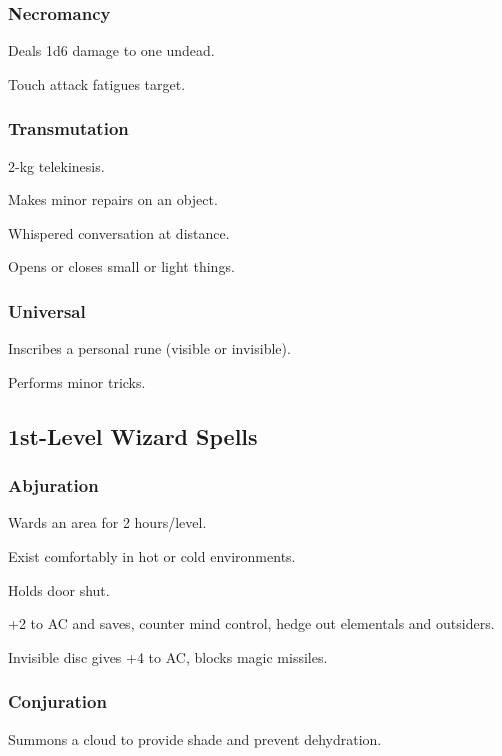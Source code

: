 \subsubsection{Necromancy}
	 Deals 1d6 damage to one undead.

	 Touch attack fatigues target.

\subsubsection{Transmutation}
	 2-kg telekinesis.

	 Makes minor repairs on an object.

	 Whispered conversation at distance.

	 Opens or closes small or light things.

\subsubsection{Universal}
	 Inscribes a personal rune (visible or invisible).

	 Performs minor tricks.



\subsection{1st-Level Wizard Spells}

\subsubsection{Abjuration}
	 Wards an area for 2 hours/level.

	 Exist comfortably in hot or cold environments.

	 Holds door shut.

	 +2 to AC and saves, counter mind control, hedge out elementals and outsiders.

	 Invisible disc gives +4 to AC, blocks magic missiles.

\subsubsection{Conjuration}
	 Summons a cloud to provide shade and prevent dehydration. %

